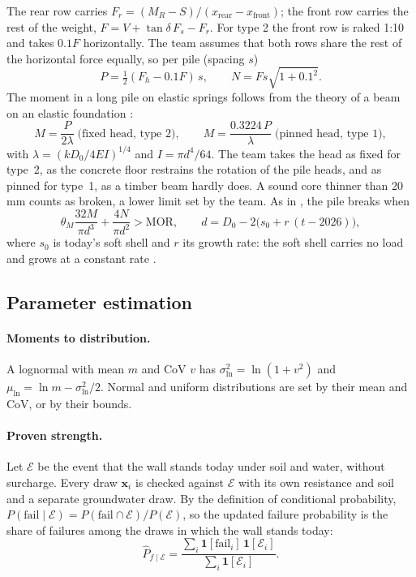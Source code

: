 The rear row carries $F_r = (M_R - S)/(x_\text{rear} - x_\text{front})$; the
front row carries the rest of the weight, $F = V + \tan\delta\,F_s - F_r$. For
type 2 the front row is raked 1:10 and takes $0.1F$ horizontally. The team
assumes that both rows share the rest of the horizontal force equally, so per
pile (spacing $s$)
\begin{equation}
P = \tfrac12 (F_h - 0.1F)\,s, \qquad N = F s \sqrt{1 + 0.1^2}.
\end{equation}
The moment in a long pile on elastic springs follows from the theory of a beam
on an elastic foundation \parencite{hetenyi1946}:
\begin{equation}
M = \frac{P}{2\lambda} \;\text{(fixed head, type 2)}, \qquad
M = \frac{0.3224\,P}{\lambda} \;\text{(pinned head, type 1)},
\end{equation}
with $\lambda = \left(k D_0 / 4 E I\right)^{1/4}$ and $I = \pi d^4/64$. The
team takes the head as fixed for type~2, as the concrete floor restrains the
rotation of the pile heads, and as pinned for type~1, as a timber beam hardly
does. A sound core thinner than 20\,mm counts as broken, a lower limit set by
the team. As in \textcite[eq.~7.3]{hemel2023}, the pile breaks when
\begin{equation}
\theta_M \frac{32 M}{\pi d^3} + \frac{4N}{\pi d^2} > \text{MOR},
\qquad d = D_0 - 2\bigl(s_0 + r\,(t - 2026)\bigr),
\end{equation}
where $s_0$ is today's soft shell and $r$ its growth rate: the soft shell
carries no load and grows at a constant rate \parencite{hemel2023,nen8707}.

\subsection{Parameter estimation}\label{app:prob-estimation}

\paragraph{Moments to distribution.} A lognormal with mean $m$ and CoV $v$ has
$\sigma_{\ln}^2 = \ln(1 + v^2)$ and $\mu_{\ln} = \ln m - \sigma_{\ln}^2/2$.
Normal and uniform distributions are set by their mean and CoV, or by their
bounds.

\paragraph{Proven strength.} Let $\mathcal{E}$ be the event that the wall stands today
under soil and water, without surcharge. Every draw $\mathbf{x}_i$ is checked
against $\mathcal{E}$ with its own resistance and soil and a separate groundwater draw.
By the definition of conditional probability,
$P(\text{fail} \mid \mathcal{E}) = P(\text{fail} \cap \mathcal{E})/P(\mathcal{E})$,
so the updated failure probability is the share of failures among the draws in
which the wall stands today:
\begin{equation}
\hat P_{f\mid \mathcal{E}} = \frac{\sum_i \mathbf{1}[\text{fail}_i]\,\mathbf{1}[\mathcal{E}_i]}{\sum_i \mathbf{1}[\mathcal{E}_i]}.
\end{equation}


